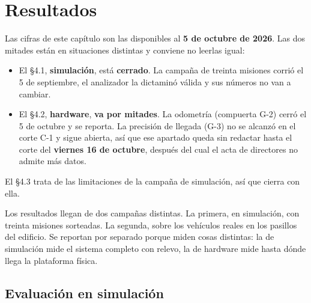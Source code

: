 %
\chapter{Resultados}

\begin{notaavance}
Las cifras de este capítulo son las disponibles al \textbf{5 de octubre de
2026}. Las dos mitades están en situaciones distintas y conviene no leerlas
igual:

\begin{itemize}[leftmargin=*,nosep]
  \item El §4.1, \textbf{simulación}, está \textbf{cerrado}. La campaña de
    treinta misiones corrió el 5 de septiembre, el analizador la dictaminó
    válida y sus números no van a cambiar.
  \item El §4.2, \textbf{hardware}, \textbf{va por mitades}. La odometría
    (compuerta G-2) cerró el 5 de octubre y se reporta. La precisión de llegada
    (G-3) no se alcanzó en el corte C-1 y sigue abierta, así que ese apartado
    queda sin redactar hasta el corte del \textbf{viernes 16 de octubre},
    después del cual el acta de directores no admite más datos.
\end{itemize}

El §4.3 trata de las limitaciones de la campaña de simulación, así que cierra
con ella.
\end{notaavance}

Los resultados llegan de dos campañas distintas. La primera, en simulación, con
treinta misiones sorteadas. La segunda, sobre los vehículos reales en los
pasillos del edificio. Se reportan por separado porque miden cosas distintas: la
de simulación mide el sistema completo con relevo, la de hardware mide hasta
dónde llega la plataforma física.

\section{Evaluación en simulación}

